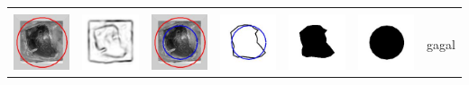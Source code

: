 \begin{table}[H]
\begin{tabular}{|m{0.7in}|m{0.7in}|m{0.7in}|m{0.7in}|m{0.7in}|m{0.7in}|m{0.7in}|}
		&  &  & & & &  \\
		\includegraphics[width=0.7in]{dataset/dataset_3/luka_hitam/ready/18_integer_init.jpg}&
		\includegraphics[width=0.7in]{dataset/dataset_3/luka_hitam/ready/18_integer_ext.jpg}&
		\includegraphics[width=0.7in]{dataset/dataset_3/luka_hitam/ready/18_integer_result.jpg}&
		\includegraphics[width=0.7in]{dataset/dataset_3/luka_hitam/ready/18_gt_r_integer.jpg}&
		\includegraphics[width=0.7in]{dataset/dataset_3/luka_hitam/ready/18_r.jpg}&
		\includegraphics[width=0.7in]{dataset/dataset_3/luka_hitam/ready/18_integer_r.jpg}&
		gagal\\
		\hline
		

\end{tabular}
\end{table}
